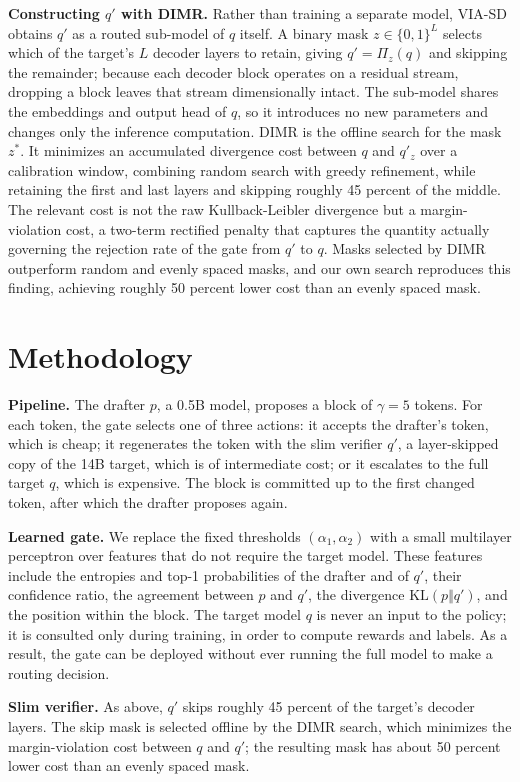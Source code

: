 \documentclass[11pt]{article}
\begin{document}
\textbf{Constructing $q'$ with DIMR.} Rather than training a separate model, VIA-SD obtains $q'$ as a
routed sub-model of $q$ itself. A binary mask $z\in\{0,1\}^L$ selects which of the target's $L$ decoder
layers to retain, giving $q'=\Pi_z(q)$ and skipping the remainder; because each decoder block operates
on a residual stream, dropping a block leaves that stream dimensionally intact. The sub-model shares
the embeddings and output head of $q$, so it introduces no new parameters and changes only the
inference computation. DIMR is the offline search for the mask $z^*$. It minimizes an accumulated
divergence cost between $q$ and $q'_z$ over a calibration window, combining random search with greedy
refinement, while retaining the first and last layers and skipping roughly 45 percent of the middle.
The relevant cost is not the raw Kullback-Leibler divergence but a margin-violation cost, a two-term
rectified penalty that captures the quantity actually governing the rejection rate of the gate from
$q'$ to $q$. Masks selected by DIMR outperform random and evenly spaced masks, and our own search
reproduces this finding, achieving roughly 50 percent lower cost than an evenly spaced mask.

\section{Methodology}
\textbf{Pipeline.} The drafter $p$, a 0.5B model, proposes a block of $\gamma=5$ tokens. For each
token, the gate selects one of three actions: it accepts the drafter's token, which is cheap; it
regenerates the token with the slim verifier $q'$, a layer-skipped copy of the 14B target, which is of
intermediate cost; or it escalates to the full target $q$, which is expensive. The block is committed
up to the first changed token, after which the drafter proposes again.

\textbf{Learned gate.} We replace the fixed thresholds $(\alpha_1,\alpha_2)$ with a small multilayer
perceptron over features that do not require the target model. These features include the entropies and
top-1 probabilities of the drafter and of $q'$, their confidence ratio, the agreement between $p$ and
$q'$, the divergence $\mathrm{KL}(p\Vert q')$, and the position within the block. The target model $q$
is never an input to the policy; it is consulted only during training, in order to compute rewards and
labels. As a result, the gate can be deployed without ever running the full model to make a routing
decision.

\textbf{Slim verifier.} As above, $q'$ skips roughly 45 percent of the target's decoder layers. The
skip mask is selected offline by the DIMR search, which minimizes the margin-violation cost between $q$
and $q'$; the resulting mask has about 50 percent lower cost than an evenly spaced mask.
\end{document}
